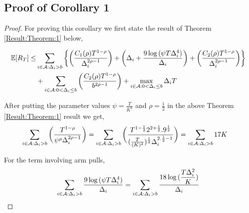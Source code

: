 \subsection{Proof of Corollary 1}
\label{sec:proofTheorem:Corollary1}
\begin{proof}
\label{Proof:Corollary:1}
For proving this corollary we first state the result of Theorem \ref{Result:Theorem:1} below, 
	
\begin{align*}
\mathbb{E} [R_{T}] \leq &\sum\limits_{i\in \mathcal{A} :\Delta_{i} > b}\bigg\lbrace\bigg(\dfrac{C_{1}(\rho)T^{1-\rho}}{\Delta_{i}^{2\rho -1}}\bigg) + \bigg(\Delta_{i}+\dfrac{9\log{(\psi  T\Delta_{i}^{4})}}{\Delta_{i}}\bigg) + \bigg(\dfrac{ C_{2}(\rho) T^{1-\rho}}{\Delta_{i}^{2\rho-1}} \bigg)\bigg \rbrace\\ 
  & +\sum\limits_{i\in \mathcal{A} :0 < \Delta_{i}\leq b}\bigg(\dfrac{C_{2}(\rho)T^{1-\rho}}{b^{2\rho -1}} \bigg) + \max_{i\in \mathcal{A} :0 < \Delta_{i}\leq b}\Delta_{i}T
\end{align*} 


After putting the parameter values $\psi=\frac{T}{K^2}$ and $\rho=\frac{1}{2}$ in the above Theorem \ref{Result:Theorem:1} result we get,
	\begin{align*}
	\sum_{i\in \mathcal{A} :\Delta_{i} > b}\bigg(\dfrac{T^{1-\rho}}{\psi^{\rho}\Delta_{i}^{2\rho -1}} \bigg) &= \sum_{i\in \mathcal{A} :\Delta_{i} > b}\bigg(\dfrac{T^{1-\frac{1}{2}}2^{2+\frac{1}{2}}.9^{\frac{1}{2}}}{(\frac{T}{( K)^2})^{\frac{1}{2}}\Delta_{i}^{2.\frac{1}{2}-1}} \bigg) = \sum_{i\in \mathcal{A} :\Delta_{i} > b} 17 K 
	\end{align*}
	
	
	For the term involving arm pulls,
	\begin{align*}
	\sum_{i\in \mathcal{A} :\Delta_{i} > b}\dfrac{9\log{(\psi T\Delta_{i}^{4})}}{\Delta_{i}}=\sum_{i\in \mathcal{A} :\Delta_{i} > b}\dfrac{18\log{(\dfrac{T\Delta_{i}^{2}}{K})}}{\Delta_{i}}
	\end{align*}		


\end{proof}
